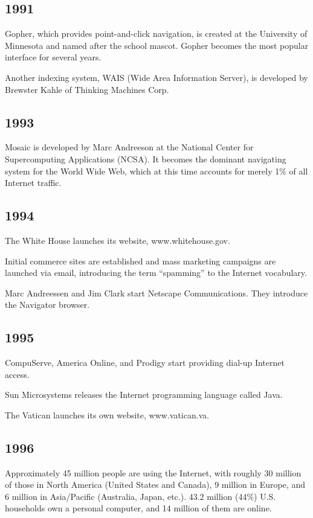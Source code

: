 \documentclass[letterpaper,12pt,english]{sphinxmanual}
\begin{document}
\subsection{1991}
\label{network-timeline:id11}
Gopher, which provides point-and-click navigation, is created at the University of Minnesota and named after the school mascot. Gopher becomes the most popular interface for several years.

Another indexing system, WAIS (Wide Area Information Server), is developed by Brewster Kahle of Thinking Machines Corp.


\subsection{1993}
\label{network-timeline:id12}
Mosaic is developed by Marc Andreeson at the National Center for Supercomputing Applications (NCSA). It becomes the dominant navigating system for the World Wide Web, which at this time accounts for merely 1\% of all Internet traffic.


\subsection{1994}
\label{network-timeline:id13}
The White House launches its website, www.whitehouse.gov.

Initial commerce sites are established and mass marketing campaigns are launched via email, introducing the term “spamming” to the Internet vocabulary.

Marc Andreessen and Jim Clark start Netscape Communications. They introduce the Navigator browser.


\subsection{1995}
\label{network-timeline:id14}
CompuServe, America Online, and Prodigy start providing dial-up Internet access.

Sun Microsystems releases the Internet programming language called Java.

The Vatican launches its own website, www.vatican.va.


\subsection{1996}
\label{network-timeline:id15}
Approximately 45 million people are using the Internet, with roughly 30 million of those in North America (United States and Canada), 9 million in Europe, and 6 million in Asia/Pacific (Australia, Japan, etc.). 43.2 million (44\%) U.S. households own a personal computer, and 14 million of them are online.
\end{document}
